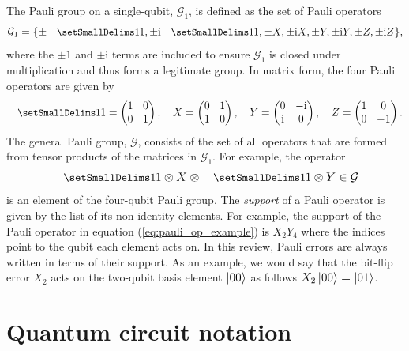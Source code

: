 \documentclass[]{arxiv}
\theoremstyle{plain}%
\theoremstyle{definition}
\theoremstyle{remark}
\DeclareRobustCommand\openone{\leavevmode\hbox{\small1\normalsize\kern-.33em1}}
\begin{document}
The Pauli group on a single-qubit, $\mathcal{G}_1$, is defined as the set of Pauli operators 
%
\begin{equation}
\mathcal{G}_1=\{\pm \openone, \pm \text{i} \openone, \pm X, \pm \text{i} X, \pm Y, \pm \text{i} Y, \pm Z, \pm \text{i} Z \}\rm,
\end{equation}
%
where the $\pm 1$ and $\pm \text{i}$ terms are included to ensure $\mathcal{G}_1$ is closed under multiplication and thus forms a legitimate group. In matrix form, the four Pauli operators are given by
%
\begin{equation}
\openone = \left(\begin{matrix}
1 & 0\\0& 1
\end{matrix}\right), \quad
X=\left(\begin{matrix}
0 & 1\\1& 0
\end{matrix}\right), \quad
Y=\left(\begin{matrix}
0 & -\text{i}\\ \text{i}& 0
\end{matrix}\right), \quad
Z = \left(\begin{matrix}
1 & 0\\0& -1
\end{matrix}\right)\rm .
\end{equation}
%
The general Pauli group, $\mathcal{G}$, consists of the set of all operators that are formed from tensor products of the matrices in $\mathcal{G}_1$. For example, the operator
%
\begin{equation}\label{eq:pauli_op_example}
\openone \otimes X \otimes \openone \otimes Y \in \mathcal{G}
\end{equation}
%
is an element of the four-qubit Pauli group. The \textit{support} of a Pauli operator is given by the list of its non-identity elements. For example, the support of the Pauli operator in equation (\ref{eq:pauli_op_example}) is $X_2Y_4$ where the indices point to the qubit each element acts on. In this review, Pauli errors are always written in terms of their support. As an example, we would say that the bit-flip error $X_2$ acts on the two-qubit basis element $\ket{00}$ as follows $X_2\ket{00}=\ket{01}$.  

\section{Quantum circuit notation} \label{app:circuit_notation}
\end{document}

